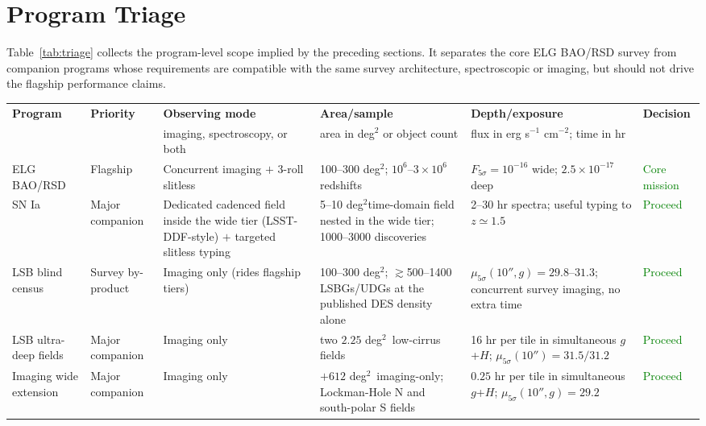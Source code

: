 \documentclass[10pt,onecolumn]{article}
\renewcommand{\arraystretch}{1.18}
\newcommand{\degti}{deg$^2$}
\begin{document}
\clearpage
\section{Program Triage}

Table~\ref{tab:triage} collects the program-level scope implied by the preceding sections. It separates the core ELG BAO/RSD survey from companion programs whose requirements are compatible with the same survey architecture, spectroscopic or imaging, but should not drive the flagship performance claims.

\begin{table}[tp]
\centering
\sffamily\footnotesize
\setlength{\tabcolsep}{3.5pt}
\renewcommand{\arraystretch}{0.94}
\begin{tabularx}{\textwidth}{@{}p{2.1cm}p{1.6cm}p{2.7cm}p{2.9cm}p{2.9cm}Y@{}}
\toprule
\textbf{Program} & \textbf{Priority} & \textbf{Observing mode} & \textbf{Area/sample} & \textbf{Depth/exposure} & \textbf{Decision}\\
 & & imaging, spectroscopy, or both & area in deg$^2$ or object count & flux in erg s$^{-1}$ cm$^{-2}$; time in hr & \\
\midrule
ELG BAO/RSD & Flagship & Concurrent imaging $+$ 3-roll slitless & 100--300 \degti; $10^6$--$3\times10^6$ redshifts & $F_{5\sigma}=10^{-16}$ wide; $2.5\times10^{-17}$ deep & \textcolor{green}{Core mission}\\
SN Ia & Major companion & Dedicated cadenced field inside the wide tier (LSST-DDF-style) $+$ targeted slitless typing & 5--10 \degti time-domain field nested in the wide tier; 1000--3000 discoveries & 2--30 hr spectra; useful typing to $z\simeq1.5$ & \textcolor{green}{Proceed}\\
LSB blind census & Survey by-product & Imaging only (rides flagship tiers) & 100--300 \degti; $\gtrsim$500--1400 LSBGs/UDGs at the published DES density alone & $\mu_{5\sigma}(10'',g)=29.8$--$31.3$; concurrent survey imaging, no extra time & \textcolor{green}{Proceed}\\
LSB ultra-deep fields & Major companion & Imaging only & two $2.25$ \degti\ low-cirrus fields & 16 hr per tile in simultaneous $g$+$H$; $\mu_{5\sigma}(10'')=31.5/31.2$ & \textcolor{green}{Proceed}\\
Imaging wide extension & Major companion & Imaging only & $+612$ \degti\ imaging-only; Lockman-Hole N and south-polar S fields & $0.25$ hr per tile in simultaneous $g$+$H$; $\mu_{5\sigma}(10'',g)=29.2$ & \textcolor{green}{Proceed}\\

\end{tabularx}
\end{table}
\end{document}
